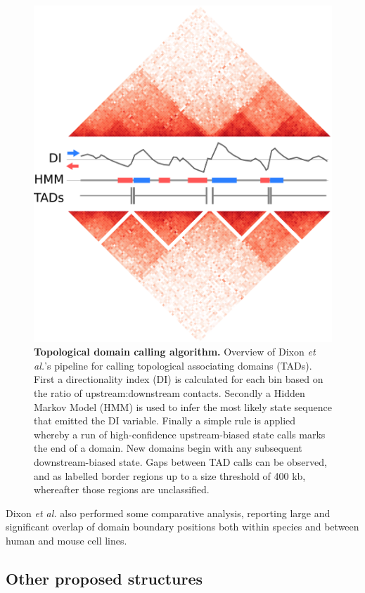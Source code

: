 \documentclass[a4paper,10pt,oneside]{book}
\begin{document}
\begin{figure}
\begin{center}
\includegraphics[width=.88\textwidth]{figs/di_example.png}
\captionsetup{width=1.2\textwidth}
\caption{ {\bf Topological domain calling algorithm. } 
Overview of Dixon \emph{et al.}'s\cite{Dixon2012} pipeline for calling topological associating domains (TADs). First a directionality index (DI) is calculated for each bin based on the ratio of upstream:downstream contacts. Secondly a Hidden Markov Model (HMM) is used to infer the most likely state sequence that emitted the DI variable. Finally a simple rule is applied whereby a run of high-confidence upstream-biased state calls marks the end of a domain. New domains begin with any subsequent downstream-biased state. Gaps between TAD calls can be observed, and as labelled border regions up to a size threshold of 400 kb, whereafter those regions are unclassified.\cite{Dixon2012}
}\label{fig:dicalc}
\end{center}
\end{figure} 

Dixon \emph{et al.}\cite{Dixon2012} also performed some comparative analysis, reporting large and significant overlap of domain boundary positions both within species and between human and mouse cell lines.

\subsection{Other proposed structures}
\end{document}
